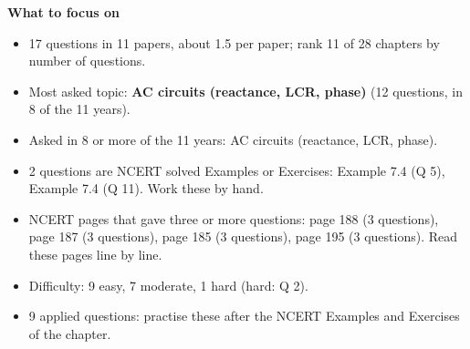 \begin{minipage}[t]{0.63\linewidth}{\small\textbf{\color{crimson}What to focus on}\par\smallskip
\begin{itemize}[leftmargin=1.1em,itemsep=1pt,topsep=0pt]
\item 17 questions in 11 papers, about 1.5 per paper; rank 11 of 28 chapters by number of questions.
\item Most asked topic: \textbf{AC circuits (reactance, LCR, phase)} (12 questions, in 8 of the 11 years).
\item Asked in 8 or more of the 11 years: AC circuits (reactance, LCR, phase).
\item 2 questions are NCERT solved Examples or Exercises: Example 7.4 (Q 5), Example 7.4 (Q 11). Work these by hand.
\item NCERT pages that gave three or more questions: page 188 (3 questions), page 187 (3 questions), page 185 (3 questions), page 195 (3 questions). Read these pages line by line.
\item Difficulty: 9 easy, 7 moderate, 1 hard (hard: Q 2).
\item 9 applied questions: practise these after the NCERT Examples and Exercises of the chapter.
\end{itemize}}\end{minipage}\par
{}
